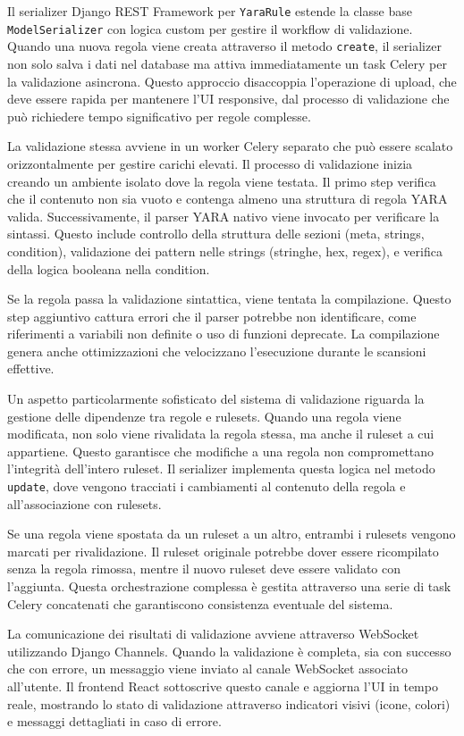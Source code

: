 Il serializer Django REST Framework per \texttt{YaraRule} estende la classe base \texttt{ModelSerializer} con logica custom per gestire il workflow di validazione. Quando una nuova regola viene creata attraverso il metodo \texttt{create}, il serializer non solo salva i dati nel database ma attiva immediatamente un task Celery per la validazione asincrona. Questo approccio disaccoppia l'operazione di upload, che deve essere rapida per mantenere l'UI responsive, dal processo di validazione che può richiedere tempo significativo per regole complesse.

La validazione stessa avviene in un worker Celery separato che può essere scalato orizzontalmente per gestire carichi elevati. Il processo di validazione inizia creando un ambiente isolato dove la regola viene testata. Il primo step verifica che il contenuto non sia vuoto e contenga almeno una struttura di regola YARA valida. Successivamente, il parser YARA nativo viene invocato per verificare la sintassi. Questo include controllo della struttura delle sezioni (meta, strings, condition), validazione dei pattern nelle strings (stringhe, hex, regex), e verifica della logica booleana nella condition.

Se la regola passa la validazione sintattica, viene tentata la compilazione. Questo step aggiuntivo cattura errori che il parser potrebbe non identificare, come riferimenti a variabili non definite o uso di funzioni deprecate. La compilazione genera anche ottimizzazioni che velocizzano l'esecuzione durante le scansioni effettive.

Un aspetto particolarmente sofisticato del sistema di validazione riguarda la gestione delle dipendenze tra regole e rulesets. Quando una regola viene modificata, non solo viene rivalidata la regola stessa, ma anche il ruleset a cui appartiene. Questo garantisce che modifiche a una regola non compromettano l'integrità dell'intero ruleset. Il serializer implementa questa logica nel metodo \texttt{update}, dove vengono tracciati i cambiamenti al contenuto della regola e all'associazione con rulesets.

Se una regola viene spostata da un ruleset a un altro, entrambi i rulesets vengono marcati per rivalidazione. Il ruleset originale potrebbe dover essere ricompilato senza la regola rimossa, mentre il nuovo ruleset deve essere validato con l'aggiunta. Questa orchestrazione complessa è gestita attraverso una serie di task Celery concatenati che garantiscono consistenza eventuale del sistema.

La comunicazione dei risultati di validazione avviene attraverso WebSocket utilizzando Django Channels. Quando la validazione è completa, sia con successo che con errore, un messaggio viene inviato al canale WebSocket associato all'utente. Il frontend React sottoscrive questo canale e aggiorna l'UI in tempo reale, mostrando lo stato di validazione attraverso indicatori visivi (icone, colori) e messaggi dettagliati in caso di errore.

